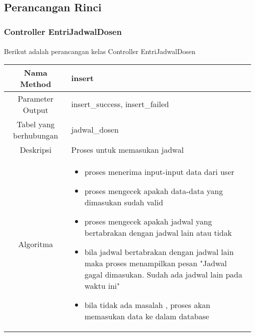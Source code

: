 \subsection{Perancangan Rinci}
\subsubsection{Controller EntriJadwalDosen}
\paragraph{} Berikut adalah perancangan kelas Controller EntriJadwalDosen \\
\begin{tabular}{|c|p{11cm}|}
\hline
Nama Method 	& 	insert 	\\
\hline
Parameter Output & insert\_success, insert\_failed \\
\hline
Tabel yang berhubungan & jadwal\_dosen \\
\hline
Deskripsi	& Proses untuk memasukan jadwal \\
\hline
Algoritma	& \begin{itemize}
				\item proses menerima input-input data dari user
				\item proses mengecek apakah data-data yang dimasukan sudah valid
				\item proses mengecek apakah jadwal yang bertabrakan dengan jadwal lain atau tidak
				\item bila jadwal bertabrakan dengan jadwal lain maka proses menampilkan pesan "Jadwal gagal dimasukan. Sudah ada jadwal lain pada waktu ini"
				\item bila tidak ada masalah , proses akan memasukan data ke dalam database
				\end{itemize} \\
\hline
\end{tabular}
\\

